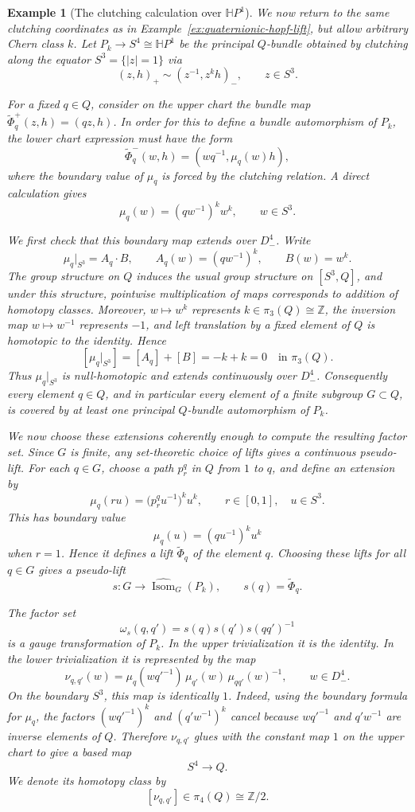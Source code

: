 \documentclass[11pt,a4paper]{article}
\numberwithin{equation}{section}
\newtheorem{example}[definition]{Example}
\theoremstyle{named}
\begin{document}
\begin{example}[The clutching calculation over \(\mathbb H P^1\)]
\label{ex:clutching-HP1}
We now return to the same clutching coordinates as in Example~\ref{ex:quaternionic-hopf-lift}, but allow arbitrary Chern class \(k\). Let \(P_k\to S^4\cong\mathbb H P^1\) be the principal \(Q\)-bundle obtained by clutching along the equator \(S^3=\{|z|=1\}\) via
\[
(z,h)_+\sim(z^{-1},z^k h)_-,
\qquad z\in S^3.
\]

For a fixed \(q\in Q\), consider on the upper chart the bundle map
\(\widetilde\Phi_q^+(z,h)=(qz,h)\). In order for this to define a bundle automorphism of \(P_k\), the lower chart expression must have the form
\[
\widetilde\Phi_q^-(w,h)=(wq^{-1},\mu_q(w)h),
\]
where the boundary value of \(\mu_q\) is forced by the clutching relation. A direct calculation gives
\[
\mu_q(w)=(qw^{-1})^k w^k,
\qquad w\in S^3.
\]

We first check that this boundary map extends over \(D^4_-\). Write
\[
\mu_q|_{S^3}=A_q\cdot B,
\qquad
A_q(w)=(qw^{-1})^k,
\qquad
B(w)=w^k.
\]
The group structure on \(Q\) induces the usual group structure on \([S^3,Q]\), and under this structure, pointwise multiplication of maps corresponds to addition of homotopy classes. Moreover, \(w\mapsto w^k\) represents \(k\in\pi_3(Q)\cong\mathbb Z\), the inversion map \(w\mapsto w^{-1}\) represents \(-1\), and left translation by a fixed element of \(Q\) is homotopic to the identity. Hence
\[
[\mu_q|_{S^3}]=[A_q]+[B]=-k+k=0\quad\text{in }\pi_3(Q).
\]
Thus \(\mu_q|_{S^3}\) is null-homotopic and extends continuously over \(D^4_-\). Consequently every element \(q\in Q\), and in particular every element of a finite subgroup \(G\subset Q\), is covered by at least one principal \(Q\)-bundle automorphism of \(P_k\).

We now choose these extensions coherently enough to compute the resulting factor set. Since \(G\) is finite, any set-theoretic choice of lifts gives a continuous pseudo-lift. For each \(q\in G\), choose a path \(p^q_r\) in \(Q\) from \(1\) to \(q\), and define an extension by
\[
\mu_q(ru)=\bigl(p^q_r u^{-1}\bigr)^k u^k,
\qquad
r\in[0,1],
\quad u\in S^3.
\]
This has boundary value
\[
\mu_q(u)=(qu^{-1})^k u^k
\]
when \(r=1\). Hence it defines a lift \(\widetilde\Phi_q\) of the element \(q\). Choosing these lifts for all \(q\in G\) gives a pseudo-lift
\[
s:G\longrightarrow \widehat{\operatorname{Isom}}_G(P_k),
\qquad
s(q)=\widetilde\Phi_q.
\]

The factor set
\[
\omega_s(q,q')=s(q)s(q')s(qq')^{-1}
\]
is a gauge transformation of \(P_k\). In the upper trivialization it is the identity. In the lower trivialization it is represented by the map
\[
\nu_{q,q'}(w)
=
\mu_q(wq'^{-1})\,\mu_{q'}(w)\,\mu_{qq'}(w)^{-1},
\qquad
w\in D^4_-.
\]
On the boundary \(S^3\), this map is identically \(1\). Indeed, using the boundary formula for \(\mu_q\), the factors \((wq'^{-1})^k\) and \((q'w^{-1})^k\) cancel because \(wq'^{-1}\) and \(q'w^{-1}\) are inverse elements of \(Q\). Therefore \(\nu_{q,q'}\) glues with the constant map \(1\) on the upper chart to give a based map
\[
S^4\longrightarrow Q.
\]
We denote its homotopy class by
\[
[\nu_{q,q'}]\in\pi_4(Q)\cong\mathbb Z/2.
\]


\end{example}
\end{document}
